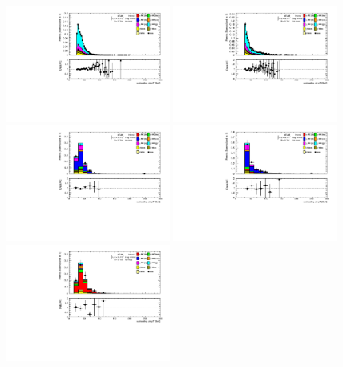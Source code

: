 \begin{figure}[htbp]
  \centering
  \includegraphics[width=0.48\textwidth]{chapters/chapter5_yybb/images/data_MC_comparison/h_CR_l_0t_nominal_subleadingJet_pt.pdf}
  \includegraphics[width=0.48\textwidth]{chapters/chapter5_yybb/images/data_MC_comparison/h_CR_h_0t_nominal_subleadingJet_pt.pdf}
  \includegraphics[width=0.48\textwidth]{chapters/chapter5_yybb/images/data_MC_comparison/h_SR_l_1t_nominal_subleadingJet_pt.pdf}
  \includegraphics[width=0.48\textwidth]{chapters/chapter5_yybb/images/data_MC_comparison/h_SR_h_1t_nominal_subleadingJet_pt.pdf}
  \includegraphics[width=0.48\textwidth]{chapters/chapter5_yybb/images/data_MC_comparison/h_SR_l_2t_nominal_subleadingJet_pt.pdf}

\end{figure}
